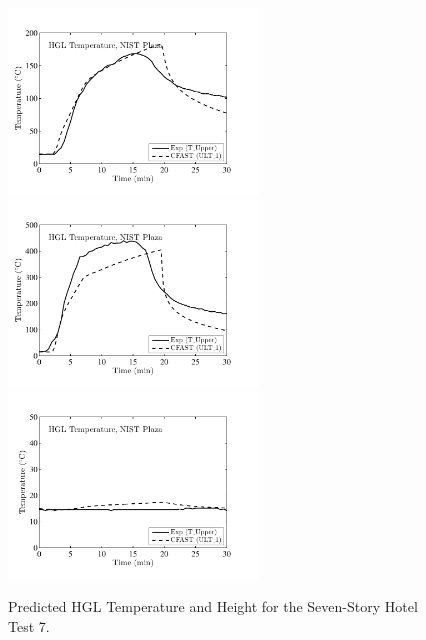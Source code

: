 \begin{figure}[p]
\begin{center}
\includegraphics[width=2.6in]{FIGURES/NIST_PLAZA/Room_1_HGL_Temp} \\
\includegraphics[width=2.6in]{FIGURES/NIST_PLAZA/Room_2_HGL_Temp} \\
\includegraphics[width=2.6in]{FIGURES/NIST_PLAZA/Room_7_HGL_Temp}
\end{center}
\caption{Predicted HGL Temperature and Height for the Seven-Story Hotel Test 7.} \label{fig:NIST_PLAZA_HGL}
\end{figure}

